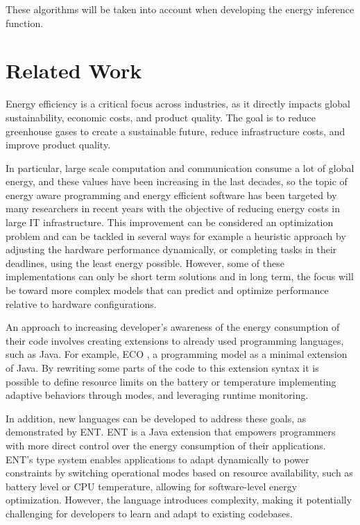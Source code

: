\documentclass[sigplan]{acmart}
\begin{document}
These algorithms will be taken into account when developing the energy inference function.


\section{Related Work} \label{sec:relatedwork}

Energy efficiency is a critical focus across industries, as it directly impacts global sustainability, economic costs, and product quality.  The goal is to reduce greenhouse gases to create a sustainable future, reduce infrastructure costs, and improve product quality\cite{annurev:/content/journals/10.1146/annurev.resource.102308.124234}. 

In particular, large scale computation and communication consume a lot of global energy, and these values have been increasing in the last decades, so the topic of energy aware programming and energy efficient software has been targeted by many researchers in recent years with the objective of reducing energy costs in large IT infrastructure\cite{8880037}.
This improvement can be considered an optimization problem and can be tackled in several ways for example a heuristic approach by adjusting the hardware performance dynamically, or completing tasks in their deadlines, using the least energy possible. However, some of these implementations can only be short term solutions and in long term, the focus will be toward more complex models that can predict and optimize performance relative to hardware configurations\cite{10.1145/1666420.1666438}. 

An approach to increasing developer's awareness of the energy consumption of their code involves creating extensions to already used programming languages, such as Java. For example, ECO \cite{7194624}, a programming model as a minimal extension of Java. By rewriting some parts of the code to this extension syntax it is possible to define resource limits on the battery or temperature implementing adaptive behaviors through modes, and leveraging runtime monitoring.

In addition, new languages can be developed to address these goals, as demonstrated by ENT\cite{10.1145/3062341.3062356}. ENT is a Java extension that empowers programmers with more direct control over the energy consumption of their applications. ENT’s type system enables applications to adapt dynamically to power constraints by switching operational modes based on resource availability, such as battery level or CPU temperature, allowing for software-level energy optimization. However, the language introduces complexity, making it potentially challenging for developers to learn and adapt to existing codebases. 
\end{document}
